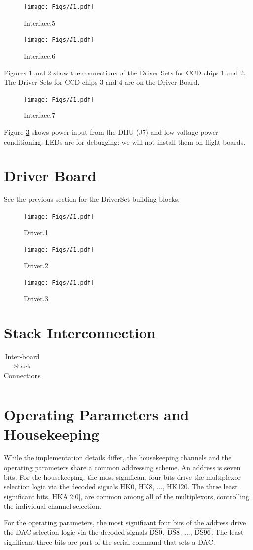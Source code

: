\documentclass[12pt]{article}
\let\oldsection\section
\renewcommand{\section}{\FloatBarrier\oldsection}
\newcommand{\schempage}[1]{
   \begin{center}
\begin{figure}[ht!]
   \centerline{\texttt{[image: Figs/\#1.pdf]}}
    \caption{#1}
    \label{#1}
    \end{figure}
\end{center}
}
\begin{document}
\schempage{Interface.5}
\schempage{Interface.6}
Figures \ref{Interface.5} and \ref{Interface.6} show the connections of the Driver Sets for CCD chips 1 and 2. The Driver Sets for CCD chips 3 and 4 are on the Driver Board.
\FloatBarrier
\schempage{Interface.7}
\FloatBarrier
Figure \ref{Interface.7} shows power input from the DHU (J7) and low voltage power conditioning. LEDs are for debugging: we will not install them on flight boards.

\section{Driver Board}
\label{Driver}
See the previous section for the DriverSet building blocks.
\schempage{Driver.1}
\schempage{Driver.2}
\schempage{Driver.3}

\section{Stack Interconnection}

\tiny{
    \begin{longtable}{|m{}|m{}|m{}|m{}|m{}|m{}|m{}|m{}|@{}m{0pt}@{}}
    \caption{Inter-board Stack Connections} \label{Stack} \\
    \hline
    
    \end{longtable}
}

\normalsize

\section{Operating Parameters and Housekeeping}
\label{param}

While the implementation details differ, the housekeeping channels and the operating  parameters share a common addressing scheme. An address is seven bits. 
For the housekeeping, the most significant four bits drive the multiplexor selection logic via the decoded signals HK0, HK8, ..., HK120. The three least significant bits, HKA[2:0], are common among all of the multiplexors, controlling the individual channel selection. 

For the operating parameters, the most significant four bits of the address drive the DAC selection logic via the decoded signals $\overline{\textup{DS0}}$, $\overline{\textup{DS8}}$, ..., $\overline{\textup{DS96}}$. The least significant three bits are part of the serial command that sets a DAC. 
\end{document}

